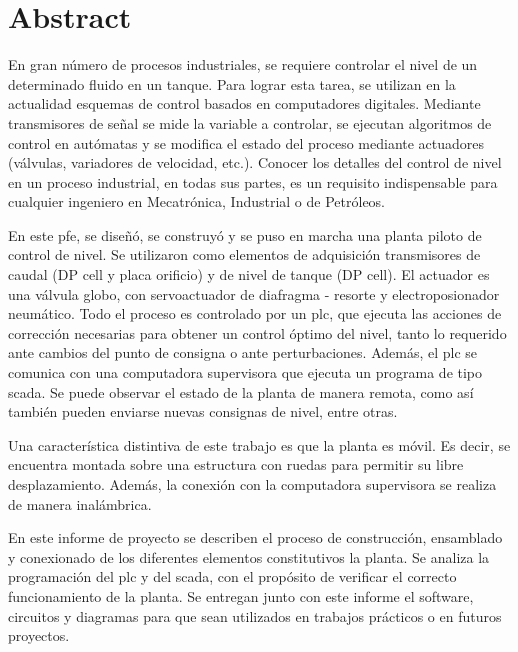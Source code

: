 \markboth{}{}
\pagestyle{empty}

\chapter*{Abstract}

En gran número de procesos industriales, se requiere controlar el
nivel de un determinado fluido en un tanque.
Para lograr esta tarea, se utilizan en la actualidad esquemas de control
basados en computadores digitales.
Mediante transmisores de señal se mide la variable a
controlar, se ejecutan algoritmos de control en autómatas y se
modifica el estado del proceso mediante actuadores (válvulas, variadores de
velocidad, etc.).
Conocer los detalles del control de nivel en un proceso industrial, en todas sus
partes, es un requisito
indispensable para cualquier ingeniero en Mecatrónica, Industrial o de
Petróleos.

En este \gls{pfe}, se diseñó, se construyó y se puso en marcha una planta
piloto de control de nivel.
Se utilizaron como elementos de adquisición transmisores de caudal (DP cell
y placa
orificio) y de nivel de tanque (DP cell).
El actuador es una válvula globo, con servoactuador de diafragma -
resorte y electroposionador neumático.
Todo el proceso es controlado por un \gls{plc},
que ejecuta las acciones de
corrección necesarias para obtener un control óptimo del nivel, tanto lo
requerido ante cambios del punto de consigna o ante perturbaciones.
Además, el \gls{plc} se comunica con una computadora supervisora que ejecuta
un programa de tipo \gls{scada}.
Se puede observar el estado de la
planta de manera remota, como así también pueden enviarse nuevas consignas de
nivel,
entre otras.

Una característica distintiva de este trabajo es que la planta es móvil.
Es decir, se encuentra montada sobre una estructura con ruedas para permitir su
libre desplazamiento.
Además, la conexión con la computadora supervisora se realiza de manera
inalámbrica.

En este informe de proyecto se describen el proceso de construcción,
ensamblado y conexionado de los diferentes elementos constitutivos la planta.
Se analiza la programación del \gls{plc} y del \gls{scada}, con el
propósito de verificar el correcto funcionamiento de la planta.
Se entregan junto con este informe el software, circuitos y diagramas para
que sean utilizados en trabajos prácticos o en futuros proyectos.


